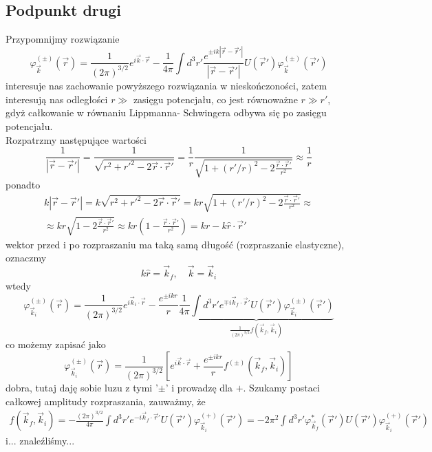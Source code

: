 \documentclass[a4paper,12pt]{article}
\begin{document}
    	\subsection{Podpunkt drugi}
    	Przypomnijmy rozwiązanie
    	$$
    		\varphi_{\vec{k}}^{(\pm)}(\vec{r}) = \frac{1}{(2\pi)^{3/2}}e^{i\vec{k}\cdot\vec{r}} - \frac{1}{4\pi}\int d^3r' \frac{e^{\pm ik|\vec{r}-\vec{r}'|}}{|\vec{r}-\vec{r}'|}U(\vec{r}')\varphi_{\vec{k}}^{(\pm)}(\vec{r}')
    	$$
    	interesuje nas zachowanie powyższego rozwiązania w nieskończoności, zatem interesują nas odległości $r\gg$ zasięgu potencjału, co jest równoważne $r\gg r'$, gdyż całkowanie 
    	w równaniu Lippmanna- Schwingera odbywa się po zasięgu potencjału.\\
    	Rozpatrzmy następujące wartości
    	$$
    		\frac{1}{|\vec{r}-\vec{r}'|}=\frac{1}{\sqrt{r^2+r'^2-2\vec{r}\cdot\vec{r}'}} = \frac{1}{r}\frac{1}{\sqrt{1+(r'/r)^2-2\frac{\vec{r}\cdot\vec{r}'}{r^2}}}
    		\approx \frac{1}{r}
    	$$
    	ponadto
    	$$
    	\begin{gathered}
    		k|\vec{r}-\vec{r}'| = k\sqrt{r^2+r'^2-2\vec{r}\cdot\vec{r}'} = kr\sqrt{1+(r'/r)^2-2\frac{\vec{r}\cdot\vec{r}'}{r^2}} \approx \\
    		\approx kr\sqrt{1-2\frac{\vec{r}\cdot\vec{r}'}{r^2}} \approx kr\left(1-\frac{\vec{r}\cdot\vec{r}'}{r^2}\right) = kr - k\hat{r}\cdot\vec{r}'
    	\end{gathered}
    	$$
    	wektor przed i po rozpraszaniu ma taką samą długość (rozpraszanie elastyczne), oznaczmy
    	$$
    		k\hat{r} = \vec{k}_f,\quad \vec{k}=\vec{k}_i
    	$$
    	wtedy
    	$$
    		\varphi_{\vec{k}_i}^{(\pm)}(\vec{r}) = \frac{1}{(2\pi)^{3/2}}e^{i\vec{k}_i\cdot\vec{r}} - \frac{e^{\pm ikr}}{r}\underbrace{\frac{1}{4\pi}\int d^3r' e^{\mp i\vec{k}_f\cdot\vec{r}'}U(\vec{r}')\varphi_{\vec{k}_i}^{(\pm)}(\vec{r}')}_{\frac{1}{(2\pi)^{3/2}}f(\vec{k}_f,\vec{k}_i)}
    	$$
    	co możemy zapisać jako
    	$$
    		\varphi_{\vec{k}_i}^{(\pm)}(\vec{r}) = \frac{1}{(2\pi)^{3/2}}\left[e^{i\vec{k}\cdot\vec{r}}+\frac{e^{\pm ikr}}{r}f^{(\pm)}(\vec{k}_f,\vec{k}_i)\right]
    	$$
    	dobra, tutaj daję sobie luzu z tymi '$\pm$' i prowadzę dla $+$. Szukamy postaci całkowej amplitudy rozpraszania, zauważmy, że
    	$$
    	\begin{gathered}
    		f(\vec{k}_f,\vec{k}_i) = -\frac{(2\pi)^{3/2}}{4\pi}\int d^3r' e^{-i\vec{k}_f\cdot\vec{r}'}U(\vec{r}')\varphi_{\vec{k}_i}^{(+)}(\vec{r}') = -2\pi^2 \int d^3r' \varphi_{\vec{k}_f}^*(\vec{r}')U(\vec{r}')\varphi_{\vec{k}_i}^{(+)}(\vec{r}') 
    	\end{gathered}
    	$$
    	i... znaleźliśmy...
\end{document}
